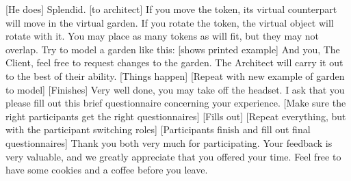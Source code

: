		[He does]
		Splendid. [to architect] If you move the token, its virtual counterpart will move in the virtual garden. If you rotate the token, the virtual object will rotate with it. You may place as many tokens as will fit, but they may not overlap. 
		Try to model a garden like this:
		[shows printed example]
		And you, The Client, feel free to request changes to the garden. The Architect will carry it out to the best of their ability. 
		[Things happen]
		[Repeat with new example of garden to model]
		[Finishes]
		Very well done, you may take off the headset. I ask that you please fill out this brief questionnaire concerning your experience. 
		[Make sure the right participants get the right questionnaires]
		[Fills out]
		[Repeat everything, but with the participant switching roles]
		[Participants finish and fill out final questionnaires]
		Thank you both very much for participating. Your feedback is very valuable, and we greatly appreciate that you offered your time. Feel free to have some cookies and a coffee before you leave.

\newpage
